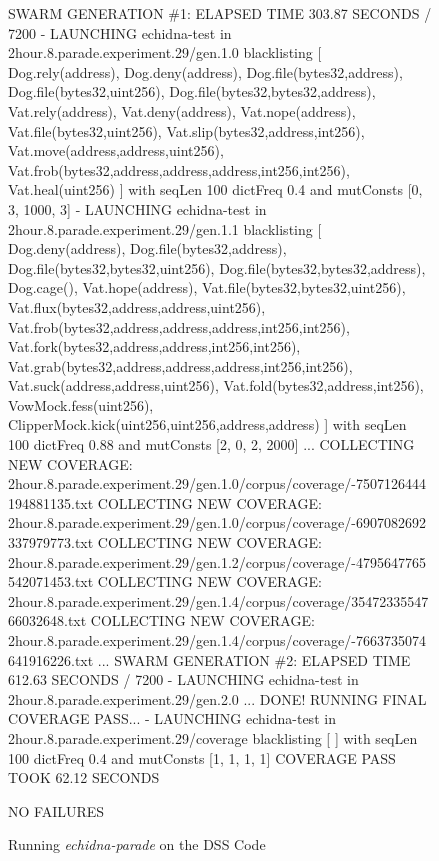 \documentclass[sigconf]{acmart}
\begin{document}
{\begin{figure*}
{\begin{code}
SWARM GENERATION \#1: ELAPSED TIME 303.87 SECONDS / 7200
- LAUNCHING echidna-test in 2hour.8.parade.experiment.29/gen.1.0 blacklisting [ Dog.rely(address), Dog.deny(address), Dog.file(bytes32,address), Dog.file(bytes32,uint256),
  Dog.file(bytes32,bytes32,address), Vat.rely(address), Vat.deny(address), Vat.nope(address), Vat.file(bytes32,uint256), Vat.slip(bytes32,address,int256),
   Vat.move(address,address,uint256), Vat.frob(bytes32,address,address,address,int256,int256), Vat.heal(uint256) ] with seqLen 100 dictFreq 0.4 and mutConsts  [0, 3, 1000, 3]
- LAUNCHING echidna-test in 2hour.8.parade.experiment.29/gen.1.1 blacklisting [ Dog.deny(address), Dog.file(bytes32,address), Dog.file(bytes32,bytes32,uint256),
  Dog.file(bytes32,bytes32,address), Dog.cage(), Vat.hope(address), Vat.file(bytes32,bytes32,uint256), Vat.flux(bytes32,address,address,uint256),
   Vat.frob(bytes32,address,address,address,int256,int256), Vat.fork(bytes32,address,address,int256,int256), Vat.grab(bytes32,address,address,address,int256,int256),
  Vat.suck(address,address,uint256), Vat.fold(bytes32,address,int256), VowMock.fess(uint256), ClipperMock.kick(uint256,uint256,address,address) ] with seqLen 100
  dictFreq 0.88 and mutConsts  [2, 0, 2, 2000]
...
COLLECTING NEW COVERAGE: 2hour.8.parade.experiment.29/gen.1.0/corpus/coverage/-7507126444194881135.txt
COLLECTING NEW COVERAGE: 2hour.8.parade.experiment.29/gen.1.0/corpus/coverage/-6907082692337979773.txt
COLLECTING NEW COVERAGE: 2hour.8.parade.experiment.29/gen.1.2/corpus/coverage/-4795647765542071453.txt
COLLECTING NEW COVERAGE: 2hour.8.parade.experiment.29/gen.1.4/corpus/coverage/3547233554766032648.txt
COLLECTING NEW COVERAGE: 2hour.8.parade.experiment.29/gen.1.4/corpus/coverage/-7663735074641916226.txt
...
SWARM GENERATION \#2: ELAPSED TIME 612.63 SECONDS / 7200
- LAUNCHING echidna-test in 2hour.8.parade.experiment.29/gen.2.0
...
DONE!
RUNNING FINAL COVERAGE PASS...
- LAUNCHING echidna-test in 2hour.8.parade.experiment.29/coverage blacklisting [  ] with seqLen 100 dictFreq 0.4 and mutConsts  [1, 1, 1, 1]
COVERAGE PASS TOOK 62.12 SECONDS

NO FAILURES
\end{code}
}
\caption{Running \emph{echidna-parade} on the DSS Code}
\label{fig:parade}
\end{figure*}

}
\end{document}
